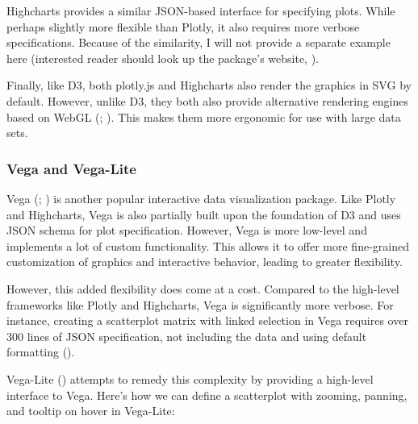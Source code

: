 \documentclass[
]{book}
\theoremstyle{definition}
\theoremstyle{definition}
\theoremstyle{definition}
\theoremstyle{definition}
\theoremstyle{remark}
\begin{document}
Highcharts provides a similar JSON-based interface for specifying plots. While perhaps slightly more flexible than Plotly, it also requires more verbose specifications. Because of the similarity, I will not provide a separate example here (interested reader should look up the package's website, ).

Finally, like D3, both plotly.js and Highcharts also render the graphics in SVG by default. However, unlike D3, they both also provide alternative rendering engines based on WebGL (; ). This makes them more ergonomic for use with large data sets.

\subsubsection{Vega and Vega-Lite}\label{vega-and-vega-lite}

Vega (; ) is another popular interactive data visualization package. Like Plotly and Highcharts, Vega is also partially built upon the foundation of D3 and uses JSON schema for plot specification. However, Vega is more low-level and implements a lot of custom functionality. This allows it to offer more fine-grained customization of graphics and interactive behavior, leading to greater flexibility.

However, this added flexibility does come at a cost. Compared to the high-level frameworks like Plotly and Highcharts, Vega is significantly more verbose. For instance, creating a scatterplot matrix with linked selection in Vega requires over 300 lines of JSON specification, not including the data and using default formatting ().

Vega-Lite () attempts to remedy this complexity by providing a high-level interface to Vega. Here's how we can define a scatterplot with zooming, panning, and tooltip on hover in Vega-Lite:
\end{document}
